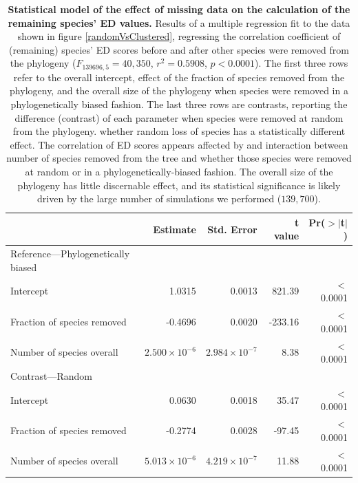 \documentclass[10pt,english]{article}
\begin{document}
\begin{table}[ht]
  \centering
  \begin{tabular}{lrrrr}
    \hline
    & Estimate & Std. Error & t value & Pr($>$$|$t$|$) \\ \hline
    Reference---Phylogenetically biased\\
    Intercept & 1.0315 & 0.0013 & 821.39 & $<$0.0001 \\
    Fraction of species removed & -0.4696 & 0.0020 & -233.16 & $<$0.0001 \\
    Number of species overall & $2.500 \times 10^{-6}$ & $2.984 \times 10^{-7}$ & 8.38 & $<$0.0001 \\
    Contrast---Random\\
    Intercept & 0.0630 & 0.0018 & 35.47 & $<$0.0001 \\
    Fraction of species removed & -0.2774 & 0.0028 & -97.45 & $<$0.0001 \\
    Number of species overall & $5.013 \times 10^{-6}$ & $4.219 \times 10^{-7}$ & 11.88 & $<$0.0001 \\ \hline
  \end{tabular}
  \caption{\textbf{Statistical model of the effect of missing data on
      the calculation of the remaining species' ED values.} Results of
    a multiple regression fit to the data shown in figure
    \ref{randomVsClustered}, regressing the correlation coefficient of
    (remaining) species' ED scores before and after other species were
    removed from the phylogeny ($F_{139696,5} = 40,350$, $r^{2} =
    0.5908$, $p <
    0.0001$). The first three rows refer to the overall intercept,
    effect of the fraction of species removed from the phylogeny, and
    the overall size of the phylogeny when species were removed in a
    phylogenetically biased fashion. The last three rows are
    contrasts, reporting the difference (contrast) of each parameter
    when species were removed at random from the phylogeny. whether
    random loss of species has a statistically different effect. The
    correlation of ED scores appears affected by and interaction
    between number of species removed from the tree and whether those
    species were removed at random or in a phylogenetically-biased
    fashion. The overall size of the phylogeny has little discernable
    effect, and its statistical significance is likely driven by the
    large number of simulations we performed ($139,700$).}
\label{missing_regression}
\end{table}
\end{document}
